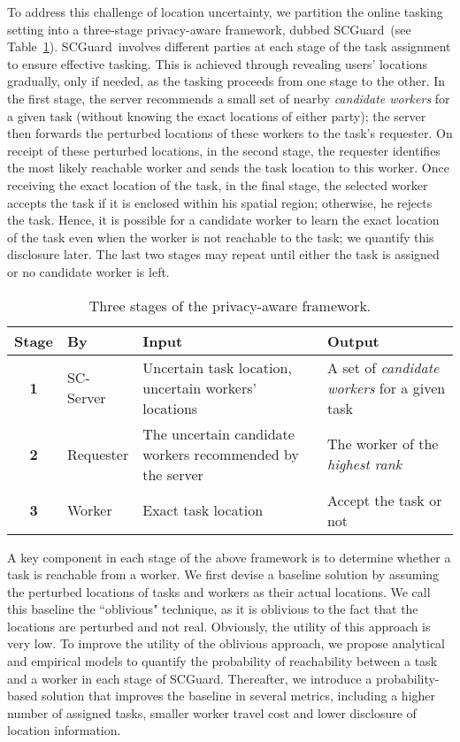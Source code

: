 \documentclass{USC-Thesis}
\newcommand{\SCG}{{SCGuard}}
\numberwithin{equation}{chapter}
\begin{document}
To address this challenge of location uncertainty, we partition the online tasking setting into a three-stage privacy-aware framework, dubbed \SCG\ (see Table~\ref{tab:stages}). \SCG\ involves different parties at each stage of the task assignment to ensure effective tasking. This is achieved through revealing users' locations gradually, only if needed, as the tasking proceeds from one stage to the other. In the first stage, the server recommends a small set of nearby \emph{candidate workers} for a given task (without knowing the exact locations of either party); the server then forwards the perturbed locations of these workers to the task's requester. On receipt of these perturbed locations, in the second stage, the requester identifies the most likely reachable worker and sends the task location to this worker. Once receiving the exact location of the task, in the final stage, the selected worker accepts the task if it is enclosed within his spatial region; otherwise, he rejects the task. Hence, it is possible for a candidate worker to learn the exact location of the task even when the worker is not reachable to the task; we quantify this disclosure later. The last two stages may repeat until either the task is assigned or no candidate worker is left.

\begin{table}[ht]
\begin{center}
\footnotesize
\begin{tabular}{ | c | l | m{12.5em} | m{10em} | } 
\hline
\textbf{Stage}					& \textbf{By} & \textbf{Input} 				& \textbf{Output} \\
\hline
\textbf{1} 	& SC-Server	&  Uncertain task location, uncertain workers' locations			&  A set of \emph{candidate workers} for a given task \\ 
\hline
\textbf{2}	& Requester & The uncertain candidate workers recommended by the server & The worker of the \emph{highest rank} \\  
\hline
\textbf{3} 	& Worker	&  Exact task location			& Accept the task or not \\ 
\hline
\end{tabular}
\caption{Three stages of the privacy-aware framework.}
\label{tab:stages}
\end{center}
\end{table}

A key component in each stage of the above framework is to determine whether a task is reachable from a worker. We first devise a baseline solution by assuming the perturbed locations of tasks and workers as their actual locations. We call this baseline the ``oblivious" technique, as it is oblivious to the fact that the locations are perturbed and not real. Obviously, the utility of this approach is very low. To improve the utility of the oblivious approach, we propose analytical and empirical models to quantify the probability of reachability between a task and a worker in each stage of \SCG. Thereafter, we introduce a probability-based solution that improves the baseline in several metrics, including a higher number of assigned tasks, smaller worker travel cost and lower disclosure of location information. 
\end{document}
